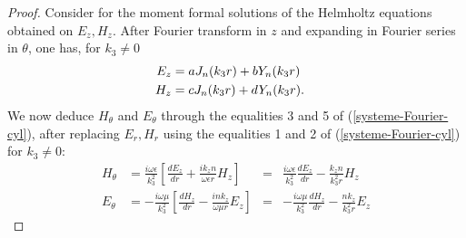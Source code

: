             \begin{proof}
                Consider for the moment formal solutions of the Helmholtz equations obtained on $E_z,H_z$.
                After Fourier transform in $z$ and expanding in Fourier series in $\theta$, one has, for $k_3\not=0$
                \begin{align*}
                    E_z&=aJ_n(k_3r)+bY_n(k_3r)\cr
                    H_z&=cJ_n(k_3r)+dY_n(k_3r).
                \end{align*}
                We now deduce $H_{\theta}$ and $E_{\theta}$ through the equalities 3 and 5 of (\ref{systeme-Fourier-cyl}), after replacing $E_r, H_r$ using the equalities 1 and 2 of (\ref{systeme-Fourier-cyl}) for $k_3\not=0$:
                \begin{align*}
                    H_{\theta}&=\frac{i\omega \epsilon}{k_3^2}[\frac{dE_z}{dr}+\frac{ik_zn}{\omega \epsilon r}H_z]&=& \frac{i\omega \epsilon}{k_3^2}\frac{dE_z}{dr}-\frac{k_zn}{k_3^2 r}H_z
                    \\
                    E_{\theta}&=-\frac{i\omega \mu}{k_3^2}[\frac{dH_z}{dr}-\frac{ink_z}{\omega \mu r}E_z]&=&-\frac{i\omega \mu}{k_3^2}\frac{dH_z}{dr}-\frac{nk_z}{k_3^2 r}E_z
                \end{align*}


\end{proof}
